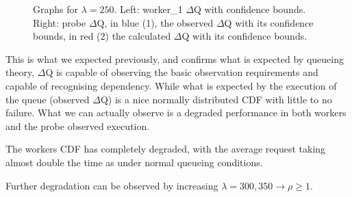 \begin{figure}[H]
\begin{subfigure}{.5\textwidth}
                \label{fig:high_load_2}
            \end{subfigure}
            \label{fig:early_ov}
            \caption{Graphs for $\lambda = 250$. Left: worker\_1 $\Delta$Q with confidence bounds. \\
            Right: probe $\Delta$Q, in blue (1), the observed $\Delta$Q with its confidence bounds, in red (2) the calculated $\Delta$Q with its confidence bounds.}
        \end{figure}
    
    This is what we expected previously, and confirms what is expected by queueing theory, $\Delta$Q is capable of observing the basic observation requirements and capable of recognising dependency. While what is expected by the execution of the queue (observed $\Delta$Q) is a nice normally distributed CDF with little to no failure. What we can actually observe is a degraded performance in both workers and the probe observed execution.

    The workers CDF has completely degraded, with the average request taking almost double the time as under normal queueing conditions. 

    Further degradation can be observed by increasing $\lambda = {300, 350} \rightarrow \rho \ge 1$.

